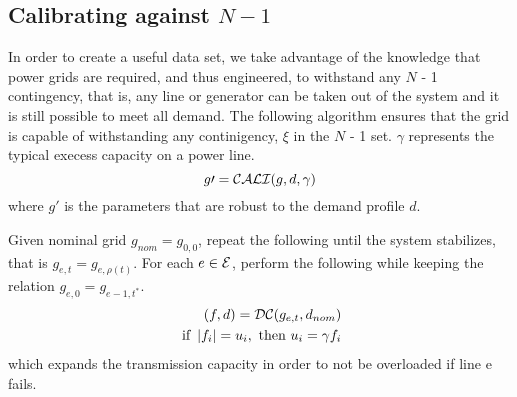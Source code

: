 
\subsection{Calibrating against $N-1$}
In order to create a useful data set, we take advantage of the knowledge that power grids are required, and thus engineered, to withstand any $N$ - 1 contingency, that is, any line or generator can be taken out of the system and it is still possible to meet all demand.  The following algorithm ensures that the grid is capable of withstanding any continigency, $\xi$ in the $N$ - 1 set. $\gamma$ represents the typical execess capacity on a power line.
\begin{equation}
g \prime = \mathcal{CALI} ( g, d, \gamma ) 
\end{equation}
where $g \prime $ is the parameters that are robust to the demand profile $d$.  

Given nominal grid $g_{nom} = g_{0,0} $, repeat the following until the system stabilizes, that is $g_{e,t} = g_{ e, \rho (t) } $.
For each $e \in \mathcal{E}$, perform the following while keeping the relation $g_{e,0} = g_{ e-1, t^* }$.
\begin{align}
	( f , d ) = \mathcal{DC} (g_{e,t}, d_{nom} )  \\
\mbox{ if } \left| f_i \right| = u_i, 
	\mbox{ then }  u_i = \gamma f_i
\end{align}
which expands the transmission capacity in order to not be overloaded if line e fails.  